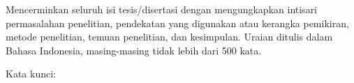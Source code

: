 \noindent Mencerminkan seluruh isi tesis/disertasi dengan mengungkapkan
intisari permasalahan penelitian, pendekatan yang digunakan atau
kerangka pemikiran, metode penelitian, temuan penelitian, dan
kesimpulan. Uraian ditulis dalam Bahasa
Indonesia, masing-masing tidak lebih dari 500 kata. 

\vspace{5mm}

\noindent Kata kunci: 